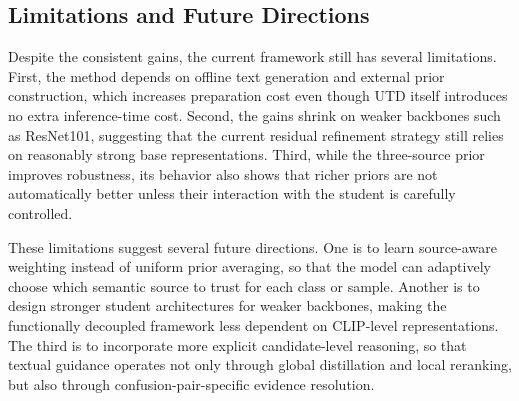 


\subsection{Limitations and Future Directions}

Despite the consistent gains, the current framework still has several limitations. First, the method depends on offline text generation and external prior construction, which increases preparation cost even though UTD itself introduces no extra inference-time cost. Second, the gains shrink on weaker backbones such as ResNet101, suggesting that the current residual refinement strategy still relies on reasonably strong base representations. Third, while the three-source prior improves robustness, its behavior also shows that richer priors are not automatically better unless their interaction with the student is carefully controlled.

These limitations suggest several future directions. One is to learn source-aware weighting instead of uniform prior averaging, so that the model can adaptively choose which semantic source to trust for each class or sample. Another is to design stronger student architectures for weaker backbones, making the functionally decoupled framework less dependent on CLIP-level representations. The third is to incorporate more explicit candidate-level reasoning, so that textual guidance operates not only through global distillation and local reranking, but also through confusion-pair-specific evidence resolution.
